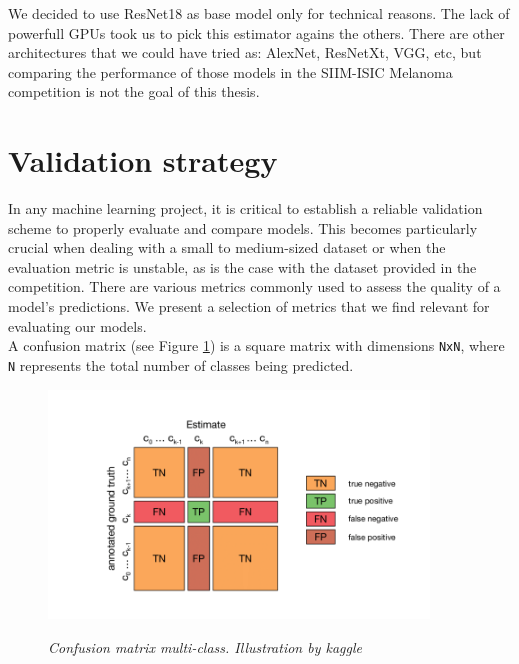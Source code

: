 We decided to use ResNet18 as base model only for technical reasons. The lack
of powerfull GPUs took us to pick this estimator agains the others. There are
other architectures that we could have tried as: AlexNet, ResNetXt, VGG, etc,
but comparing the performance of those models in the SIIM-ISIC Melanoma
competition is not the goal of this thesis.

\section{Validation strategy}

In any machine learning project, it is critical to establish a reliable
validation scheme to properly evaluate and compare models. This becomes
particularly crucial when dealing with a small to medium-sized dataset or when
the evaluation metric is unstable, as is the case with the dataset provided in
the competition. There are various metrics commonly used to assess the quality of a model's
predictions. We present a selection of metrics that we find relevant for
evaluating our models. \\

A confusion matrix (see Figure \ref{fig:confusion-matrix}) is a square matrix
with dimensions {\tt NxN}, where {\tt N} represents the total number of classes being
predicted.

\begin{figure}[H]
  \begin{adjustbox}{trim={0pt 0.5cm 0pt 1cm}, clip}
    \centering
    \includegraphics[width=0.9\textwidth]{imatges/validation-strategy/confusion-matrix.png}
  \end{adjustbox}
  \caption[Confusion matrix multi-class]{\textit{Confusion matrix multi-class. Illustration by kaggle}}
  {\label{fig:confusion-matrix}}
\end{figure}

